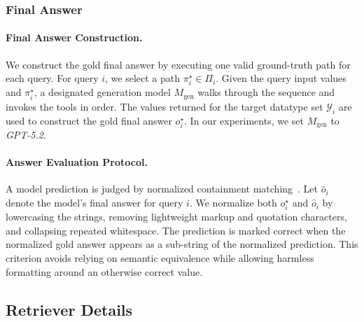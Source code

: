 \subsubsection{Final Answer}
\label{app:final-answer-groundtruth}



\paragraph{Final Answer Construction.}
We construct the gold final answer by executing one valid ground-truth path for each query. 
For query $i$, we select a path $\pi_i^\star \in \Pi_i$. 
Given the query input values and $\pi_i^\star$, a designated generation model $M_{\mathrm{gen}}$ walks through the sequence and invokes the tools in order. 
The values returned for the target datatype set $\mathcal{Y}_i$ are used to construct the gold final answer $o_i^\star$. 
In our experiments, we set $M_{\mathrm{gen}}$ to \textit{GPT-5.2}.

\paragraph{Answer Evaluation Protocol.}
A model prediction is judged by normalized containment matching~\citep{NAACL}. 
Let $\hat{o}_i$ denote the model's final answer for query $i$. 
We normalize both $o_i^\star$ and $\hat{o}_i$ by lowercasing the strings, removing lightweight markup and quotation characters, and collapsing repeated whitespace. 
The prediction is marked correct when the normalized gold answer appears as a sub-string of the normalized prediction. 
This criterion avoids relying on semantic equivalence while allowing harmless formatting around an otherwise correct value.

\subsection{Retriever Details}
\label{app:retriever-details}



